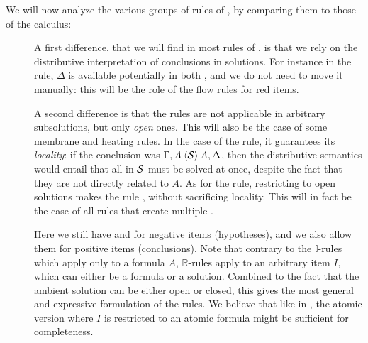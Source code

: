 We will now analyze the various groups of rules of , by
comparing them to those of the  calculus:
\begin{description}
  \item[\textbf{\identity}] 
  A first difference, that we will find in most rules of , is that
  we rely on the distributive interpretation of conclusions in solutions. For
  instance in the  rule, $\Delta$ is available potentially in
  both , and we do not need to move it manually: this will be the role
  of the flow rules for red items.
  
  A second difference is that the rules are not applicable in arbitrary
  subsolutions, but only \emph{open} ones. This will also be the case of some
  membrane and heating rules. In the case of the  rule, it
  guarantees its \emph{locality}: if the conclusion was $\Gamma, A \mathbin{\langle \mathcal{S} \rangle} A,
  \Delta$, then the distributive semantics would entail that all  in
  $\mathcal{S}$ must be solved at once, despite the fact that they are not directly
  related to $A$. As for the
   rule, restricting to open solutions makes the rule
  \emph{}, without sacrificing locality. This will in fact be the case
  of all rules that create multiple .

  \item[\textbf{\resource}] 
  Here we still have  and  for negative items (hypotheses),
  and we also allow them for positive items (conclusions). Note that contrary to
  the $\mathbb{I}$-rules which apply only to a formula $A$, $\mathbb{R}$-rules
  apply to an arbitrary item $I$, which can either be a formula or a solution.
  Combined to the fact that the ambient solution can be either open or closed,
  this gives the most general and expressive formulation of the rules. We
  believe that like in , the atomic version where $I$ is restricted to an
  atomic formula might be sufficient for completeness.

  \item[\textbf{\flow}]


\end{description}

